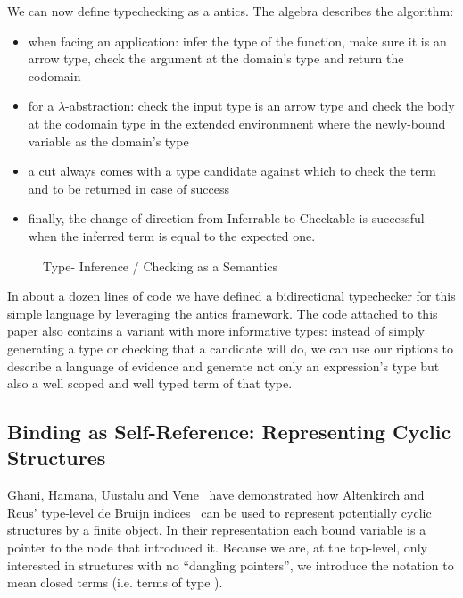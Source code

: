 We can now define typechecking as a antics. The algebra describes the
algorithm:
\begin{itemize}
  \item when facing an application: infer the type of the function, make sure
    it is an arrow type, check the argument at the domain's type and return the
    codomain
  \item for a $\lambda$-abstraction: check the input type is an arrow type and
    check the body at the codomain type in the extended environmnent where the
    newly-bound variable as the domain's type
  \item a cut always comes with a type candidate against which to check the term
    and to be returned in case of success
  \item finally, the change of direction from Inferrable to Checkable is successful
    when the inferred term is equal to the expected one.
\end{itemize}

\begin{figure}[h]
\caption{Type- Inference / Checking as a Semantics}
\end{figure}

In about a dozen lines of code we have defined a bidirectional typechecker for
this simple language by leveraging the antics framework. The code attached
to this paper also contains a variant with more informative types: instead of simply
generating a type or checking that a candidate will do, we can use our riptions
to describe a language of evidence and generate not only an expression's type but
also a well scoped and well typed term of that type.

\subsection{Binding as Self-Reference: Representing Cyclic Structures}

Ghani, Hamana, Uustalu and Vene~\cite{ghani2006representing} have
demonstrated how Altenkirch and Reus' type-level de Bruijn
indices~\cite{altenkirch1999monadic} can be used to represent
potentially cyclic structures by a finite object. In their
representation each bound variable is a pointer to the node
that introduced it. Because we are, at the top-level, only
interested in structures with no ``dangling pointers'', we introduce
the notation   to mean closed terms (i.e. terms of type
   ).

